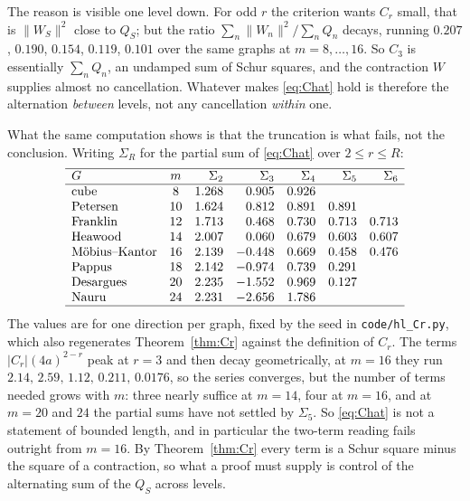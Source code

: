 \documentclass[11pt]{article}
\theoremstyle{remark}
\begin{document}
The reason is visible one level down. For odd $r$ the criterion wants $C_r$ small, that
is $\|W_S\|^2$ close to $Q_S$; but the ratio $\sum_n\|W_n\|^2/\sum_nQ_n$ decays, running
$0.207$, $0.190$, $0.154$, $0.119$, $0.101$ over the same graphs at $m=8,\dots,16$. So
$C_3$ is essentially $\sum_nQ_n$, an undamped sum of Schur squares, and the contraction
$W$ supplies almost no cancellation. Whatever makes \eqref{eq:Chat} hold is therefore the
alternation \emph{between} levels, not any cancellation \emph{within} one.

What the same computation shows is that the truncation is what fails, not the conclusion.
Writing $\Sigma_R$ for the partial sum of \eqref{eq:Chat} over $2\le r\le R$:
\[
\begin{array}{lcrrrrr}
\hline
G & m & \Sigma_2 & \Sigma_3 & \Sigma_4 & \Sigma_5 & \Sigma_6\\
\hline
\text{cube} & 8 & 1.268 & 0.905 & 0.926 & & \\
\text{Petersen} & 10 & 1.624 & 0.812 & 0.891 & 0.891 & \\
\text{Franklin} & 12 & 1.713 & 0.468 & 0.730 & 0.713 & 0.713\\
\text{Heawood} & 14 & 2.007 & 0.060 & 0.679 & 0.603 & 0.607\\
\text{M\"obius--Kantor} & 16 & 2.139 & -0.448 & 0.669 & 0.458 & 0.476\\
\text{Pappus} & 18 & 2.142 & -0.974 & 0.739 & 0.291 & \\
\text{Desargues} & 20 & 2.235 & -1.552 & 0.969 & 0.127 & \\
\text{Nauru} & 24 & 2.231 & -2.656 & 1.786 & & \\
\hline
\end{array}
\]
The values are for one direction per graph, fixed by the seed in
\texttt{code/hl\_Cr.py}, which also regenerates Theorem~\ref{thm:Cr} against the
definition of $C_r$. The terms $|C_r|(4a)^{2-r}$ peak at $r=3$ and then decay
geometrically, at $m=16$ they run
$2.14,\,2.59,\,1.12,\,0.211,\,0.0176$, so the series converges, but the number of
terms needed grows with $m$: three nearly suffice at $m=14$, four at $m=16$, and at
$m=20$ and $24$ the partial sums have not settled by $\Sigma_5$. So \eqref{eq:Chat} is
not a statement of bounded length, and in particular the two-term reading fails outright
from $m=16$. By Theorem~\ref{thm:Cr} every term is a Schur square minus the square of a
contraction, so what a proof must supply is control of the alternating sum of the $Q_S$
across levels.
\end{document}
